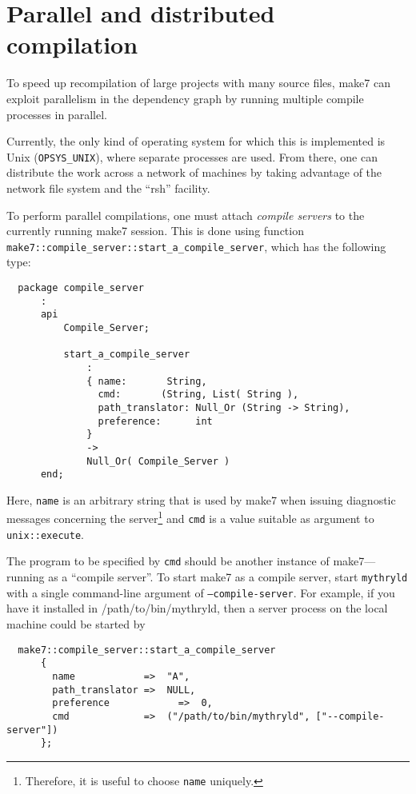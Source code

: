 
\section{Parallel and distributed compilation}
\label{sec:parmake}

To speed up recompilation of large projects with many source files,
make7 can exploit parallelism in the dependency graph by running
multiple compile processes in parallel.

Currently, the only kind of operating system for which this is
implemented is Unix ({\tt OPSYS\_UNIX}), where separate processes are
used.  From there, one can distribute the work across a network of
machines by taking advantage of the network file system and the
``rsh'' facility.

To perform parallel compilations, one must attach {\em compile
servers} to the currently running make7 session.  This is done using
function {\tt make7::compile_server::start_a_compile_server}, which has the
following type:

\begin{verbatim}
  package compile_server
      :
      api
          Compile_Server;

          start_a_compile_server
              :
              { name:       String,
                cmd:       (String, List( String ),
                path_translator: Null_Or (String -> String),
                preference:      int
              }
              ->
              Null_Or( Compile_Server )
      end;
\end{verbatim}

Here, {\tt name} is an arbitrary string that is used by make7 when
issuing diagnostic messages concerning the server\footnote{Therefore,
it is useful to choose {\tt name} uniquely.} and {\tt cmd} is a value
suitable as argument to {\tt unix::execute}.

The program to be specified by {\tt cmd} should be another instance of
make7---running as a ``compile server''.  To start make7 as a compile
server, start {\tt mythryld} with a single command-line argument of
{\tt --compile-server}.
For example, if you have it installed in /path/to/bin/mythryld, then a
server process on the local machine could be started by

\begin{verbatim}
  make7::compile_server::start_a_compile_server
      {
        name            =>  "A",
        path_translator =>  NULL,
        preference            =>  0,
        cmd             =>  ("/path/to/bin/mythryld", ["--compile-server"])
      };
\end{verbatim}

